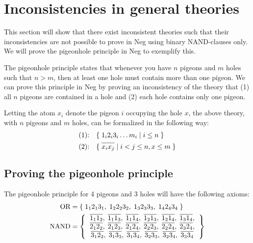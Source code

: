 
\section{Inconsistencies in general theories}
\label{sec:Inconsistencies in general theories}
This section will show that there exist inconsistent theories such that their inconsistencies are not possible to prove in Neg using binary NAND-clauses only.
We will prove the pigeonhole principle in Neg to exemplify this.

The pigeonhole principle states that whenever you have $n$ pigeons and $m$ holes such that $n > m$, then at least one hole must contain more than one pigeon.
We can prove this principle in Neg by proving an inconsistency of the theory that (1) all $n$ pigeons are contained in a hole and (2) each hole contains only one pigeon.

Letting the atom $x_i$ denote the pigeon $i$ occupying the hole $x$, the above theory, with $n$ pigeons and $m$ holes, can be formalized in the following way:
\begin{align}
  \text{(1):}\quad &\{ \; 1_i2_i3_i\dots m_i \;|\; i \leq n \; \}\\
  \text{(2):}\quad &\{ \; \ol{x_ix_j} \;|\; i < j \leq n, x \leq m \; \}
\end{align}
\subsection{Proving the pigeonhole principle}
\label{sub:Proving the pigeonhole principle}
The pigeonhole principle for 4 pigeons and 3 holes will have the following axioms:
\begin{align}
  \begin{split}
    \text{OR} &= \{ \; 1_12_13_1,\; 1_22_23_2,\; 1_32_33_3,\; 1_42_43_4 \; \}\\
    \text{NAND} &= \left \{
    \begin{tabular}{c}
      $\ol{1_11_2},\;\ol{1_11_3},\;\ol{1_11_4},\;\ol{1_21_3},\;\ol{1_21_4},\;\ol{1_31_4},$\\
      $\ol{2_12_2},\;\ol{2_12_3},\;\ol{2_12_4},\;\ol{2_22_3},\;\ol{2_22_4},\;\ol{2_32_4},$\\
      $\ol{3_12_2},\;\ol{3_13_3},\;\ol{3_13_4},\;\ol{3_23_3},\;\ol{3_23_4},\;\ol{3_33_4}$
    \end{tabular}
    \right \}
  \end{split}
  \label{eq:ax_pigeon}
\end{align}

